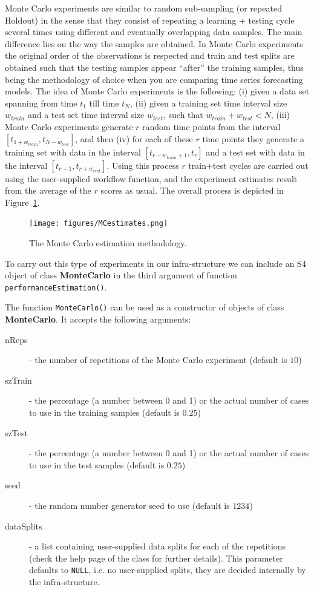\documentclass[10pt,a4paper]{article}\usepackage[]{graphicx}\usepackage[]{color}
\begin{document}
Monte Carlo experiments are similar to random sub-sampling (or repeated
Holdout) in the sense that they consist of repeating a learning +
testing cycle several times using different and eventually overlapping data samples. The main
difference lies on the way the samples are obtained. In Monte Carlo
experiments the original order of the observations is respected and
train and test splits are obtained such that the testing samples
appear ``after'' the training samples, thus being the methodology of
choice when you are comparing time series forecasting models. The idea
of Monte Carlo experiments is the following: (i) given a data set
spanning from time $t_1$ till time $t_N$, (ii) given a training set
time interval size $w_{train}$ and a test set time interval size $w_{test}$, such
that $w_{train}+w_{test} < N$, (iii) Monte Carlo experiments generate $r$ random time
points from the interval $[t_{1+w_{train}},t_{N-w_{test}}]$, and then (iv) for each
of these $r$ time points they generate a training set with data in the
interval $[t_{r-w_{train}+1},t_{r}]$ and a test set with data in the interval
$[t_{r+1},t_{r+w_{test}}]$. Using this process $r$ train+test cycles are
carried out using the user-supplied workflow function, and the
experiment estimates result from the average of the $r$ scores as
usual. The overall process is depicted in Figure~\ref{fig:MC}.

\begin{figure}[ht]
  \centering
  \texttt{[image: figures/MCestimates.png]}
  \caption{The Monte Carlo estimation methodology.}
  \label{fig:MC}
\end{figure}

To carry out this type of experiments in our infra-structure we can
include an S4 object of class \textbf{MonteCarlo} in the third
argument of function \texttt{performanceEstimation()}.

The function \texttt{MonteCarlo()} can be used as a constructor of
objects of class \textbf{MonteCarlo}. It accepts the following
arguments:

\begin{description}
\item[nReps] - the number of repetitions of the Monte Carlo experiment (default is $10$)
\item[szTrain] - the percentage (a number between 0 and 1) or the actual number of cases to use in the training samples (default is $0.25$)
\item[szTest] - the percentage (a number between 0 and 1) or the actual  number of cases to use in the test samples (default is $0.25$)
\item[seed] - the random number generator seed to use (default is $1234$)
\item[dataSplits] - a list containing user-supplied data splits
  for each of the repetitions (check the help page of the
  class for further details). This parameter defaults to
  \texttt{NULL}, i.e. no user-supplied splits, they are decided
  internally by the infra-structure.
\end{description}
\end{document}
